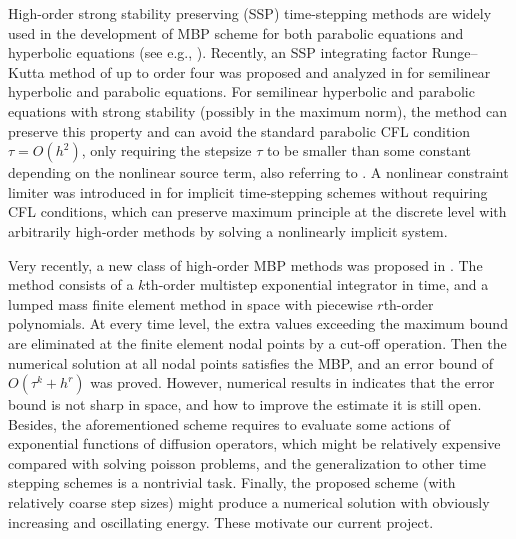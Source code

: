 \documentclass[a4paper, oneside]{book}
\newcommand{\mycomment}[1]{{\Huge\color{red}#1}}
\begin{document}
High-order strong stability preserving (SSP) time-stepping methods are widely used
in the development of MBP scheme for both parabolic equations and hyperbolic equations (see e.g.,  
\cite{gottlieb1998total,Liu-Yu-2014,GottliebShuTadmor:2001,gottlieb2011strong,Liu-Osher-1996,Qiu-Shu-2005,Xu-2014,Zhang-Shu-2010}).
Recently, an SSP integrating factor Runge--Kutta method of up to order four was proposed and
analyzed in \cite{IsherwoodGrantGottlieb:2018} for semilinear hyperbolic and parabolic equations.
For semilinear hyperbolic and parabolic equations with strong stability (possibly in the maximum norm), the method
can preserve this property and can avoid the standard parabolic CFL condition $\tau=O(h^2)$, only requiring
the stepsize $\tau$ to be smaller than some constant depending on the nonlinear source term, also referring to \cite{ju2020maximum}.
A nonlinear constraint limiter was introduced in \cite{Vegt-Xia-Xu-2019} for implicit time-stepping
schemes without requiring CFL conditions, which can preserve maximum principle at the
discrete level with arbitrarily high-order methods by solving a nonlinearly implicit system.

Very recently, a new class of high-order MBP methods was proposed in \cite{LiYangZhou:sisc}.
The method consists of a $k$th-order multistep exponential integrator
in time, and a lumped mass finite element method in space with piecewise $r$th-order
polynomials. At every time level, the extra values exceeding the maximum bound
are eliminated at the finite element nodal points by a cut-off operation.
Then the numerical solution at all nodal points
satisfies the MBP, and an error bound of $O(\tau^k + h^r)$ was proved. However, numerical results in \cite[Table 4.1]{LiYangZhou:sisc}
indicates that the error bound is not sharp in space, and how to improve the estimate it is still open.
Besides, the aforementioned scheme requires to evaluate some actions of exponential functions of diffusion operators,
which might be relatively expensive compared with solving poisson problems, and the generalization to other time stepping schemes is a nontrivial task.
Finally, the proposed scheme (with relatively coarse step sizes) might produce a numerical solution with obviously
increasing and oscillating energy. These motivate our current project.
\end{document}
